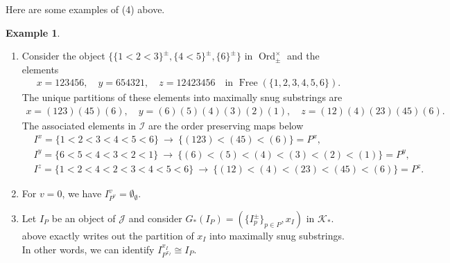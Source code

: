\documentclass[12pt, reqno]{amsart}
\theoremstyle{plain}
\theoremstyle{definition}
\newtheorem{example}[theorem]{Example}
\begin{document}
Here are some examples of (4) above.

\begin{example} \ 
\begin{enumerate}
\item Consider the object $\{\{1<2<3\}^\pm, \{4<5\}^\pm, \{6\}^\pm \}$ in $\operatorname{Ord}_\pm^\times$ and the elements
\begin{align*}
x=123456,\quad y=654321,\quad z=12423456\quad \text{in }\operatorname{Free}(\{1,2,3,4,5,6\}).
\end{align*}
The unique partitions of these elements into maximally snug substrings are
\begin{align*}
x=(123)(45)(6),\quad y=(6)(5)(4)(3)(2)(1),\quad z=(12)(4)(23)(45)(6).
\end{align*}
The associated elements in $\mathcal{I}$ are the order preserving maps below
\begin{align*}
&I^x=\{1<2<3<4<5<6\}\ \longrightarrow\ \{(123)<(45)<(6)\} =P^x, \\
&I^y=\{6<5<4<3<2<1\}\ \longrightarrow\ \{(6)<(5)<(4)<(3)<(2)<(1)\} =P^y, \\
&I^z=\{1<2<4<2<3<4<5<6\}\ \longrightarrow\ \{(12)<(4)<(23)<(45)<(6)\} =P^z.
\end{align*}

\item For $v=0$, we have $I^v_{P^v}=\emptyset_\emptyset$.

\item Let $I_P$ be an object of $\mathcal{J}$ and consider $G_\ast(I_P)=(\{I_p^\pm\}_{p\in P}, x_I)$ in $\mathcal{K}_\ast$.  above exactly writes out the partition of $x_I$ into maximally snug substrings. In other words, we can identify $I^{x_I}_{P^{x_I}}\cong I_P$.\qedhere
\end{enumerate}
\end{example}
\end{document}
